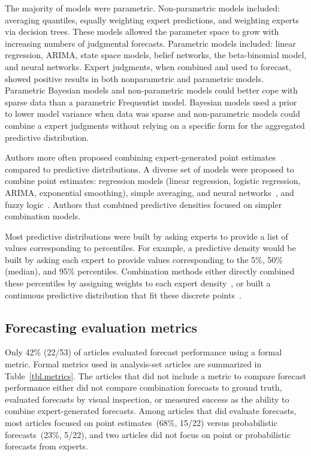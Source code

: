 \documentclass[preprint,authoryear]{elsarticle}
\begin{document}
The majority of models were parametric.
Non-parametric models included: averaging quantiles, equally weighting expert predictions, and weighting experts via decision trees.
These models allowed the parameter space to grow with increasing numbers of judgmental forecasts.
Parametric models included: linear regression, ARIMA, state space models, belief networks, the beta-binomial model, and neural networks.
Expert judgments, when combined and used to forecast, showed positive results in both nonparametric and parametric models.
Parametric Bayesian models and non-parametric models could better cope with sparse data than a parametric Frequentist model.
Bayesian models used a prior to lower model variance when data was sparse and non-parametric models could combine a expert judgments without relying on a specific form for the aggregated predictive distribution.

Authors more often proposed combining expert-generated point estimates compared to predictive distributions.
A diverse set of models were proposed to combine point estimates: regression models (linear regression, logistic regression, ARIMA, exponential smoothing), simple averaging, and neural networks~\citep{cabello2012combination,adams2009acceptability,mak1996aggregating,graefe2014combining,baron2014two}, and fuzzy logic~\cite{petrovic2006fuzzy,kabak2008aggregating,jana2019interval,ren2002optimal}.
Authors that combined predictive densities focused on simpler combination models.

Most predictive distributions were built by asking experts to provide a list of values corresponding to percentiles.
For example, a predictive density would be built by asking each expert to provide values corresponding to the 5\%, 50\% (median), and 95\% percentiles.
Combination methods either directly combined these percentiles by assigning weights to each expert density~\citep{ISI:000327676900001,hanea2018value,morales2017characterization,cai2016simple,ISI:000391078100005,kabak2008aggregating,zio1997accounting,BRITO201655}, or built a continuous predictive distribution that fit these discrete points~\cite{brito2012behavioral,abramson1996hailfinder,neves2008life,failing2004using,wang2008probabilistic,kurowicka2010probabilistic}.

\subsection{Forecasting evaluation metrics}
Only 42\% (22/53) of articles evaluated forecast performance using a formal metric.
Formal metrics used in analysis-set articles are summarized in Table~\ref{tbl.metrics}.
The articles that did not include a metric to compare forecast performance either did not compare combination forecasts to ground truth, evaluated forecasts by visual inspection, or measured success as the ability to combine expert-generated forecasts.
Among articles that did evaluate forecasts, most articles focused on point estimates~(68\%, 15/22) versus probabilistic forecasts~(23\%, 5/22), and two articles did not focus on point or probabilistic forecasts from experts.
\end{document}
